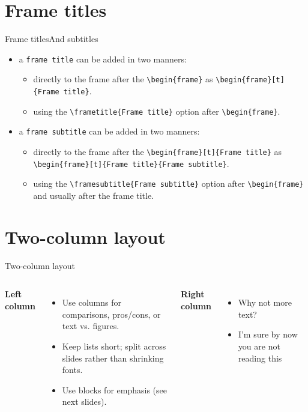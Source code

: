 \documentclass[10pt, aspectratio=169]{beamer}
\begin{document}
\section{Frame titles}
\begin{frame}[fragile=singleslide]{Frame titles}{And subtitles}

\begin{itemize}
    \item a \texttt{frame title} can be added in two manners: 
    \begin{itemize} 
       \item directly to the frame after the \verb|\begin{frame}| as \verb|\begin{frame}[t]{Frame title}|.
       \item using the \verb|\frametitle{Frame title}| option after \verb|\begin{frame}|.
    \end{itemize}
    \item a \texttt{frame subtitle} can be added in two manners: 
    \begin{itemize} 
       \item directly to the frame after the \verb|\begin{frame}[t]{Frame title}| as \verb|\begin{frame}[t]{Frame title}{Frame subtitle}|.
       \item using the \verb|\framesubtitle{Frame subtitle}| option after \verb|\begin{frame}| and usually after the frame title.
    \end{itemize}
\end{itemize}

\end{frame}

\section{Two-column layout}
\begin{frame}[t]{Two-column layout}
\begin{columns}[T,onlytextwidth]
  \textbf{Left column}
  \begin{itemize}
    \item Use columns for comparisons, pros/cons, or text vs. figures.
    \item Keep lists short; split across slides rather than shrinking fonts.
    \item Use blocks for emphasis (see next slides).
  \end{itemize}

  \textbf{Right column}
  \begin{itemize}
    \item Why not more text?
    \item I'm sure by now you are not reading this
  \end{itemize}
\end{columns}
\end{frame}
\end{document}
